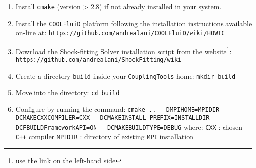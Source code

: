 \documentclass[11pt,a4paper,oneside]{article}
\begin{document}
\begin{enumerate}
\item
{
Install \texttt{cmake} (version \textgreater{} 2.8) if not already installed in your system.
}
\item
{
Install the \texttt{COOLFluiD} platform following the installation instructions available on-line at:
\newline
\newline
\hspace*{1cm} \texttt{https://github.com/andrealani/COOLFluiD/wiki/HOWTO}
}
\item
{
Download the Shock-fitting Solver installation script from the website\footnote{use the link on the left-hand side}:
\newline
\newline
\hspace*{1cm} \texttt{https://github.com/andrealani/ShockFitting/wiki}
}
\item
{
Create a directory \texttt{build} inside your \texttt{CouplingTools} home:
\newline
\newline
\hspace*{1cm} \texttt{mkdir build}
}
\item
{
Move into the directory:
\newline
\newline
\hspace*{1cm} \texttt{cd build}
}
\item
{
Configure by running the command:
\newline
\newline
\hspace*{1cm} \texttt{cmake .. - DMPI\textunderscore{}HOME=MPIDIR - DCMAKE\textunderscore{}CXX\textunderscore{}COMPILER=CXX - DCMAKE\textunderscore{}INSTALL\textunderscore{}
\newline
\hspace*{1cm} PREFIX=INSTALLDIR - DCF\textunderscore{}BUILD\textunderscore{}Framework\textunderscore{}API=ON - DCMAKE\textunderscore{}BUILD\textunderscore{}TYPE=DEBUG}
\newline
\newline
where:
\newline
\hspace*{1cm} \texttt{CXX} : chosen \texttt{C++} compiler 
\newline
\hspace*{1cm} \texttt{MPIDIR} : directory of existing \texttt{MPI} installation 
\newline
}
\end{enumerate}
\end{document}

